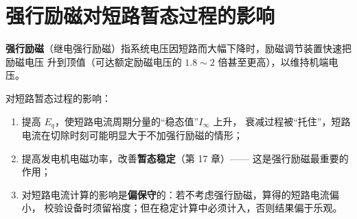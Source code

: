 \section{强行励磁对短路暂态过程的影响}

\textbf{强行励磁}（继电强行励磁）指系统电压因短路而大幅下降时，励磁调节装置快速把励磁电压
升到顶值（可达额定励磁电压的 $1.8\sim2$ 倍甚至更高），以维持机端电压。

对短路暂态过程的影响：
\begin{enumerate}
  \item 提高 $E_q$，使短路电流周期分量的“稳态值”$I_\infty$ 上升，
        衰减过程被“托住”，短路电流在切除时刻可能明显大于不加强行励磁的情形；
  \item 提高发电机电磁功率，改善\textbf{暂态稳定}（第 17 章）——
        这是强行励磁最重要的作用；
  \item 对短路电流计算的影响是\textbf{偏保守}的：若不考虑强行励磁，算得的短路电流偏小，
        校验设备时须留裕度；但在稳定计算中必须计入，否则结果偏于乐观。
\end{enumerate}

